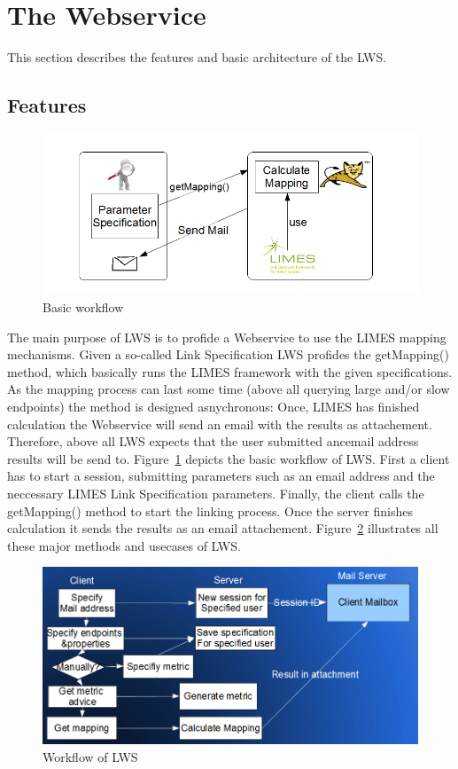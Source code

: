 \documentclass{article}
\begin{document}
\section{The Webservice}
This section describes the features and basic architecture of the LWS.
\subsection{Features}
\begin{figure}[htbp]
	\centering
		\includegraphics[width=7in]{images/limes_webservice_workflow_skizze_for_dummies.png}
	\caption{Basic workflow}
	\label{fig:limes_webservice_workflow_skizze_for_dummies}
\end{figure}
The main purpose of LWS is to profide a Webservice to use the LIMES mapping mechanisms. Given a so-called Link Specification LWS profides the getMapping() method, which basically runs the LIMES framework with the given specifications. As the mapping process can last some time (above all querying large and/or slow endpoints) the method is designed asnychronous: Once, LIMES has finished calculation the Webservice  will send an email with the results as attachement. Therefore, above all LWS expects that the user submitted ancemail address results will be send to.
Figure~\ref{fig:limes_webservice_workflow_skizze_for_dummies} depicts the basic workflow of LWS. First a client has to start a session, submitting parameters such as an email address and the neccessary LIMES Link Specification parameters. Finally, the client calls the getMapping() method to start the linking process. Once the server finishes calculation it sends the results as an email attachement. Figure~\ref{fig:workflow2} illustrates all these major methods and usecases of LWS.
\begin{figure}[h]
	\centering
		\includegraphics[width=7in]{images/workflow2.png}
	\caption{Workflow of LWS}
	\label{fig:workflow2}
\end{figure}
\end{document}
